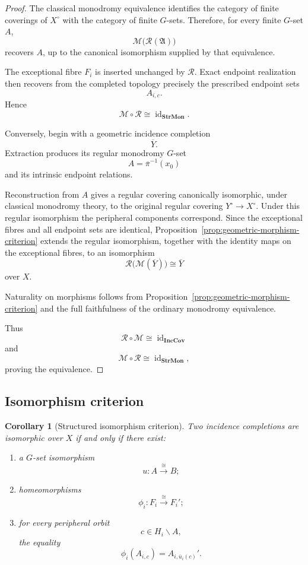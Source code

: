 \documentclass[11pt]{article}
\theoremstyle{plain}
\newtheorem{corollary}[theorem]{Corollary}
\theoremstyle{definition}
\begin{document}
\begin{proof}
The classical monodromy equivalence identifies the category of finite
coverings of $X^\circ$ with the category of finite $G$-sets.  Therefore,
for every finite $G$-set $A$,
\[
\mathscr M
\bigl(
\mathscr R(\mathfrak A)
\bigr)
\]
recovers $A$, up to the canonical isomorphism supplied by that
equivalence.

The exceptional fibre $F_i$ is inserted unchanged by
$\mathscr R$.  Exact endpoint realization then recovers from the
completed topology precisely the prescribed endpoint sets
\[
A_{i,c}.
\]
Hence
\[
\mathscr M\circ\mathscr R
\cong
\operatorname{id}_{\mathbf{StrMon}}.
\]

Conversely, begin with a geometric incidence completion
\[
\overline Y.
\]
Extraction produces its regular monodromy $G$-set
\[
A=\overline\pi^{-1}(x_0)
\]
and its intrinsic endpoint relations.

Reconstruction from $A$ gives a regular covering canonically isomorphic,
under classical monodromy theory, to the original regular covering
$Y^\circ\to X^\circ$.  Under this regular isomorphism the peripheral
components correspond.  Since the exceptional fibres and all endpoint
sets are identical, Proposition~\ref{prop:geometric-morphism-criterion} extends the
regular isomorphism, together with the identity maps on the exceptional fibres, to an
isomorphism
\[
\mathscr R\bigl(\mathscr M(\overline Y)\bigr)
\cong
\overline Y
\]
over $X$.

Naturality on morphisms follows from
Proposition~\ref{prop:geometric-morphism-criterion} and the full
faithfulness of the ordinary monodromy equivalence.

Thus
\[
\mathscr R\circ\mathscr M
\cong
\operatorname{id}_{\mathbf{IncCov}}
\]
and
\[
\mathscr M\circ\mathscr R
\cong
\operatorname{id}_{\mathbf{StrMon}},
\]
proving the equivalence.
\end{proof}


\subsection{Isomorphism criterion}
\label{subsec:structured-isomorphism}

\begin{corollary}[Structured isomorphism criterion]
\label{cor:structured-isomorphism}
Two incidence completions are isomorphic over $X$ if and only if there
exist:

\begin{enumerate}[label=(\roman*)]
\item a $G$-set isomorphism
\[
u:A\xrightarrow{\ \cong\ }B;
\]

\item homeomorphisms
\[
\phi_i:F_i\xrightarrow{\ \cong\ }F_i';
\]

\item for every peripheral orbit
\[
c\in H_i\backslash A,
\]
the equality
\[
\phi_i(A_{i,c})
=
A_{i,\overline u_i(c)}'.
\]
\end{enumerate}
\end{corollary}
\end{document}
